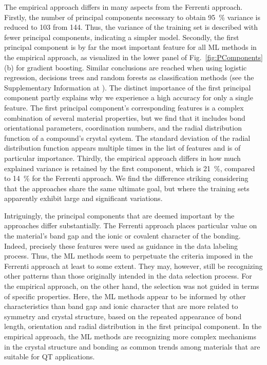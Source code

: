 \documentclass[superscriptaddress,
preprint,
 amsmath,amssymb,
 aps,
]{revtex4-2}
\begin{document}
The empirical approach differs in many aspects from the Ferrenti approach. 
Firstly, the number of principal components necessary to obtain \SI{95}{\percent} variance is reduced to \num{103} from \num{144}. 
Thus, the variance of the training set is described with fewer principal components, indicating a simpler model. Secondly, the first principal component is by far the most important feature for all ML methods in the empirical approach, as visualized in the lower panel of Fig.~\ref{fig:PComponents}(b) for gradient boosting. Similar conclusions are reached when using logistic regression, decisions trees and random forests as classification methods (see the Supplementary Information at \cite{supplementary}). 
The distinct importance of the first principal component partly explains why we experience a high accuracy for only a single feature. The first principal component's corresponding features is a complex combination of several material properties, but we find that it includes bond orientational parameters, coordination numbers, and the radial distribution function of a compound's crystal system. 
The standard deviation of the radial distribution function appears multiple times in the list of features and is of particular importance. 
Thirdly, the empirical approach differs in how much explained variance is retained by the first component, which is \SI{21}{\percent}, compared to \SI{14}{\percent} for the Ferrenti approach. 
We find the difference striking considering that the approaches share the same ultimate goal, but where the training sets apparently exhibit large and significant variations. 

Intriguingly, the principal components that are deemed important by the approaches differ substantially. The Ferrenti approach places particular value on the material's band gap and the ionic or covalent character of the bonding. Indeed, precisely these features were used as guidance in the data labeling process. Thus, the ML methods seem to perpetuate the criteria imposed in the Ferrenti approach at least to some extent. They may, however, still be recognizing other patterns than those originally intended in the data selection process. For the empirical approach, on the other hand, the selection was not guided in terms of specific properties. Here, the ML methods appear to be informed by other characteristics than band gap and ionic character that are more related to symmetry and crystal structure, based on the repeated appearance of bond length, orientation and radial distribution in the first principal component. In the empirical approach, the ML methods are recognizing more complex mechanisms in the crystal structure and bonding as common trends among materials that are suitable for QT applications.  
\end{document}
